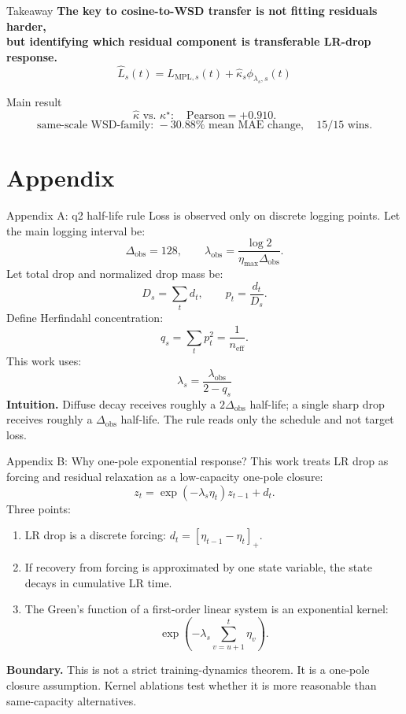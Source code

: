 \documentclass[9pt,aspectratio=169]{beamer}
\newcommand{\tightlist}{\setlength{\itemsep}{2pt}\setlength{\parskip}{0pt}}
\begin{document}
\begin{frame}{Takeaway}
\centering
\vspace{0.7em}
{\Large \textbf{The key to cosine-to-WSD transfer is not fitting residuals harder,\\
but identifying which residual component is transferable LR-drop response.}}\\[1.0em]

\small
\[
\widehat L_s(t)
=
L_{\mathrm{MPL},s}(t)
+
\widehat\kappa_s\phi_{\lambda_s,s}(t)
\]
\vspace{0.3em}

\begin{block}{Main result}
\[
\widehat\kappa \text{ vs. } \kappa^\star:
\quad
\mathrm{Pearson}=+0.910.
\]
\[
\text{same-scale WSD-family: }
-30.88\% \text{ mean MAE change},
\quad
15/15 \text{ wins}.
\]
\end{block}
\end{frame}

\appendix
\section{Appendix}

\begin{frame}{Appendix A: q2 half-life rule}
\small
Loss is observed only on discrete logging points. Let the main logging interval be:
\[
\Delta_{\mathrm{obs}}=128,
\qquad
\lambda_{\mathrm{obs}}
=
\frac{\log 2}{\eta_{\max}\Delta_{\mathrm{obs}}}.
\]
\vfill
Let total drop and normalized drop mass be:
\[
D_s=\sum_t d_t,
\qquad
p_t=\frac{d_t}{D_s}.
\]
Define Herfindahl concentration:
\[
q_s=\sum_t p_t^2=\frac{1}{n_{\mathrm{eff}}}.
\]
This work uses:
\[
\boxed{
\lambda_s=\frac{\lambda_{\mathrm{obs}}}{2-q_s}
}
\]
\vfill
\textbf{Intuition.}
Diffuse decay receives roughly a \(2\Delta_{\mathrm{obs}}\) half-life;
a single sharp drop receives roughly a \(\Delta_{\mathrm{obs}}\) half-life.
The rule reads only the schedule and not target loss.
\end{frame}

\begin{frame}{Appendix B: Why one-pole exponential response?}
\small
This work treats LR drop as forcing and residual relaxation as a low-capacity one-pole closure:
\[
z_t=\exp(-\lambda_s\eta_t)z_{t-1}+d_t.
\]
\vfill
Three points:
\begin{enumerate}\tightlist
\item LR drop is a discrete forcing: \(d_t=[\eta_{t-1}-\eta_t]_+\).
\item If recovery from forcing is approximated by one state variable, the state decays in cumulative LR time.
\item The Green's function of a first-order linear system is an exponential kernel:
\[
\exp\left(-\lambda_s\sum_{v=u+1}^{t}\eta_v\right).
\]
\end{enumerate}
\vfill
\textbf{Boundary.}
This is not a strict training-dynamics theorem.
It is a one-pole closure assumption.
Kernel ablations test whether it is more reasonable than same-capacity alternatives.
\end{frame}
\end{document}
